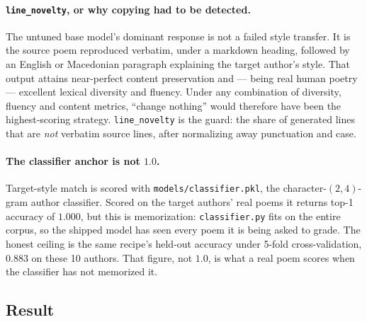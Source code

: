 \documentclass[11pt]{article}
\begin{document}
\paragraph{\texttt{line\_novelty}, or why copying had to be detected.}
The untuned base model's dominant response is not a failed style transfer. It
is the source poem reproduced verbatim, under a markdown heading, followed by
an English or Macedonian paragraph explaining the target author's style. That
output attains near-perfect content preservation and --- being real human
poetry --- excellent lexical diversity and fluency. Under any combination of
diversity, fluency and content metrics, ``change nothing'' would therefore
have been the highest-scoring strategy. \texttt{line\_novelty} is the guard:
the share of generated lines that are \emph{not} verbatim source lines, after
normalizing away punctuation and case.

\paragraph{The classifier anchor is not $1.0$.} Target-style match is scored
with \texttt{models/classifier.pkl}, the character-$(2,4)$-gram author
classifier. Scored on the target authors' real poems it returns top-1
accuracy of $1.000$, but this is memorization: \texttt{classifier.py} fits on
the entire corpus, so the shipped model has seen every poem it is being asked
to grade. The honest ceiling is the same recipe's held-out accuracy under
5-fold cross-validation, $0.883$ on these 10 authors. That figure, not $1.0$,
is what a real poem scores when the classifier has not memorized it.

\subsection{Result}
\end{document}
